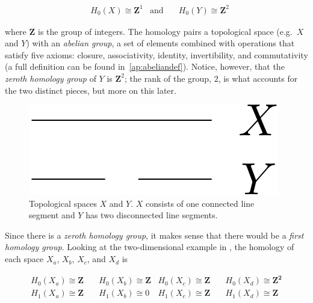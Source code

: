 \begin{align}
	& H_0(X) \cong \mathbf{Z}^1  & \text{and} & \quad H_0(Y) \cong \mathbf{Z}^2
	\label{eq:homology1d}
\end{align}

where $\mathbf{Z}$ is the group of integers. The homology pairs a topological space (e.g.\ $X$ and $Y$) with an \textit{abelian group}, a set of elements combined with operations that satisfy five axioms: closure, associativity, identity, invertibility, and commutativity (a full definition can be found in~\ref{ap:abeliandef}). Notice, however, that the \textit{zeroth homology group} of $Y$ is $\mathbf{Z}^2$; the rank of the group, $2$, is what accounts for the two distinct pieces, but more on this later.

\begin{figure}
	\begin{center}
		\includegraphics[width=0.2\columnwidth]{Figs/homology1d.pdf}
		\caption{\label{fig:homology1d} Topological spaces $X$ and $Y$. $X$ consists of one connected line segment and $Y$ has two disconnected line segments.}
	\end{center}
\end{figure}

Since there is a \textit{zeroth homology group}, it makes sense that there would be a \textit{first homology group}. Looking at the two-dimensional example in , the homology of each space $X_a$, $X_b$, $X_c$, and $X_d$ is

\begin{align}
	H_0(X_a) \cong \mathbf{Z} & \quad H_0(X_b) \cong \mathbf{Z} & H_0(X_c) \cong \mathbf{Z} & \quad H_0(X_d) \cong \mathbf{Z^2} \\
	H_1(X_a) \cong  \mathbf{Z} & \quad H_1(X_b) \cong 0 & H_1(X_c) \cong \mathbf{Z} & \quad H_1(X_d) \cong \mathbf{Z}
	 \label{eq:homology2d} 
\end{align}


